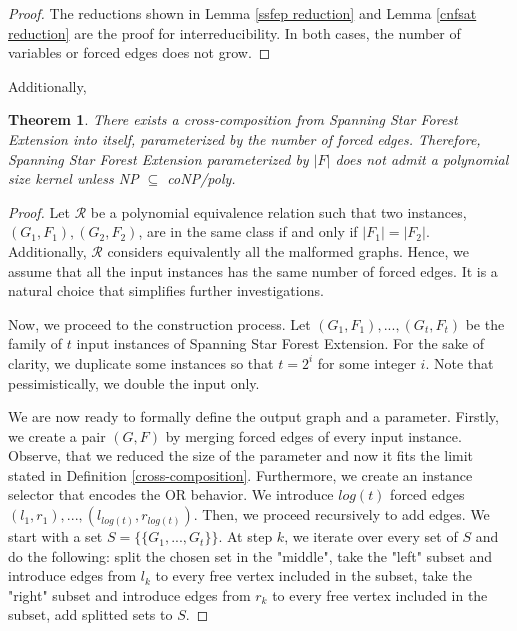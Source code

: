 \documentclass[en]{pracamgr}
\newtheorem{theorem}{Theorem}
\newcommand{\ssfep}{{\sc Spanning Star Forest Extension}}
\begin{document}
\begin{proof}
	The reductions shown in Lemma \ref{ssfep reduction} and Lemma \ref{cnfsat reduction} are the proof for interreducibility. In both cases, the number of variables or forced edges does not grow.
\end{proof}

Additionally, 

\begin{theorem}
	There exists a cross-composition from \ssfep{} into itself, parameterized by the number of forced edges. Therefore, \ssfep{} parameterized by $|F|$ does not admit a polynomial size kernel unless \textup{NP $\subseteq$ coNP/poly}.
\end{theorem}

\begin{proof}
	Let $\mathcal{R}$ be a polynomial equivalence relation such that two instances, $(G_1,F_1),(G_2, F_2)$, are in the same class if and only if $|F_1| = |F_2|$. Additionally, $\mathcal{R}$ considers equivalently all the malformed graphs. Hence, we assume that all the input instances has the same number of forced edges. It is a natural choice that simplifies further investigations.
	
	Now, we proceed to the construction process. Let $(G_1,F_1),...,(G_t,F_t)$ be the family of $t$ input instances of \ssfep{}. For the sake of clarity, we duplicate some instances so that $t = 2^i$ for some integer $i$. Note that pessimistically, we double the input only.
	
	We are now ready to formally define the output graph and a parameter. Firstly, we create a pair $(G,F)$ by merging forced edges of every input instance. Observe, that we reduced the size of the parameter and now it fits the limit stated in Definition \ref{cross-composition}. Furthermore, we create an instance selector that encodes the OR behavior. We introduce $log(t)$ forced edges $(l_1,r_1),...,(l_{log(t)},r_{log(t)})$. Then, we proceed recursively to add edges. We start with a set $S=\{\{G_1,...,G_t\}\}$. At step $k$, we iterate over every set of $S$ and do the following: split the chosen set in the "middle", take the "left" subset and introduce edges from $l_k$ to every free vertex included in the subset, take the "right" subset and introduce edges from $r_k$ to every free vertex included in the subset, add splitted sets to $S$.
	

\end{proof}
\end{document}
